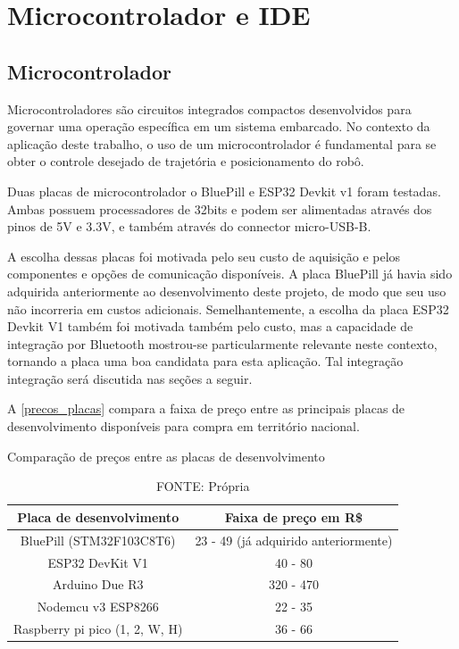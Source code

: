 
\section{Microcontrolador e IDE} \label{microcontrolador_ide}

\subsection{Microcontrolador}

Microcontroladores são circuitos integrados compactos desenvolvidos para governar
uma operação específica em um sistema embarcado. No contexto da aplicação deste
trabalho, o uso de um microcontrolador é fundamental para se obter o controle
desejado de trajetória e posicionamento do robô.

Duas placas de microcontrolador o BluePill e ESP32 Devkit v1 foram testadas.
Ambas possuem processadores de 32bits e podem ser alimentadas através dos pinos
de 5V e 3.3V, e também através do connector micro-USB-B.

A escolha dessas placas foi motivada pelo seu custo de aquisição e pelos
componentes e opções de comunicação disponíveis. A placa BluePill já havia sido
adquirida anteriormente ao desenvolvimento deste projeto, de modo que seu uso
não incorreria em custos adicionais. Semelhantemente, a escolha da placa ESP32
Devkit V1 também foi motivada também pelo custo, mas a capacidade de integração
por Bluetooth mostrou-se particularmente relevante neste contexto, tornando a
placa uma boa candidata para esta aplicação. Tal integração integração será
discutida nas seções a seguir.

A \autoref{precos_placas} compara a faixa de preço entre as principais
placas de desenvolvimento disponíveis para compra em território nacional.

\begin{table}[ht]
	\centering
	\caption{Comparação de preços entre as placas de desenvolvimento \label{precos_placas}}
	 \begin{tabular}{|c|c|}
		\hline
		\textbf{Placa de desenvolvimento} & \textbf{Faixa de preço em R\$} \\ \hline
		BluePill (STM32F103C8T6) &  23 - 49 (já adquirido anteriormente) \\ \hline
		ESP32 DevKit V1  &  40 - 80   \\ \hline
		Arduino Due R3 &  320 - 470   \\ \hline
		Nodemcu v3 ESP8266 & 22 - 35   \\ \hline
		Raspberry pi pico (1, 2, W, H)  & 36 - 66  \\ \hline
	\end{tabular}
	\caption*{FONTE: Própria}
\end{table}

